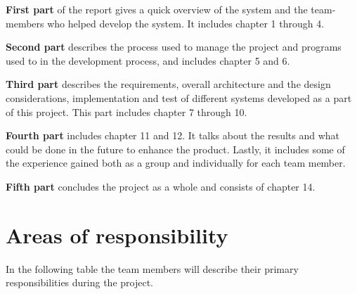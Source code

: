 \textbf{First part} of the report gives a quick overview of the system and the team-members who helped develop the system. It includes chapter 1 through 4.

\textbf{Second part} describes the process used to manage the project and programs used to in the development process, and includes chapter 5 and 6.

\textbf{Third part} describes the requirements, overall architecture and the design considerations, implementation and test of different systems developed as a part of this project. This part includes chapter 7 through 10.

\textbf{Fourth part} includes chapter 11 and 12. It talks about the results and what could be done in the future to enhance the product. Lastly, it includes some of the experience gained both as a group and individually for each team member.

\textbf{Fifth part} concludes the project as a whole and consists of chapter 14.

\clearpage
\section{Areas of responsibility}
In the following table the team members will describe their primary responsibilities during the project. 

